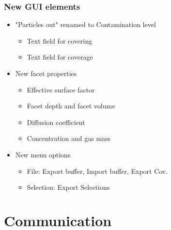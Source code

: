 \subsubsection{New GUI elements}
\begin{itemize}[noitemsep,topsep=0pt]
\item "Particles out" renamed to Contamination level
\begin{itemize}[noitemsep,topsep=0pt]
\item Text field for covering
\item Text field for coverage
\end{itemize}
\item New facet properties
\begin{itemize}[noitemsep,topsep=0pt]
\item Effective surface factor
\item Facet depth and facet volume
\item Diffusion coefficient
\item Concentration and gas mass
\end{itemize}
\item New menu options
\begin{itemize}[noitemsep,topsep=0pt]
\item File: Export buffer, Import buffer, Export Cov.
\item Selection: Export Selections
\end{itemize}
\end{itemize}

\section{Communication}
